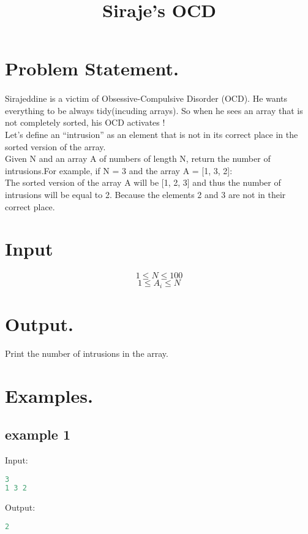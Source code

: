 \documentclass[10pt]{article}
\begin{document}
\title{Siraje's OCD}
 \date{}
\maketitle
\section{Problem Statement.}
\paragraph{}
Sirajeddine is a victim of Obsessive-Compulsive Disorder (OCD). He wants everything to be always tidy(incuding arrays). So when he sees an array that is not completely sorted, his OCD activates !\\
Let’s define an “intrusion” as an element that is not in its correct place in the sorted version of the array.\\
Given N and an array A of numbers of length N, return the number of intrusions.For example, if N = 3 and the array A = [1, 3, 2]:\\
The sorted version of the array A will be [1, 2, 3] and thus the number of intrusions will be equal to 2. Because the elements 2 and 3 are not in their correct place.
\paragraph{}
\section{Input}
$$ 1\le N \le 100 $$
$$ 1\le A_i \le N $$
\section{Output.}
Print the number of intrusions in the array.
\section{Examples.}
\subsection{example 1}
Input:
\begin{lstlisting}[language=Python]
3
1 3 2
\end{lstlisting}
Output:
\begin{lstlisting}[language=Python]
2
\end{lstlisting}
\end{document}
